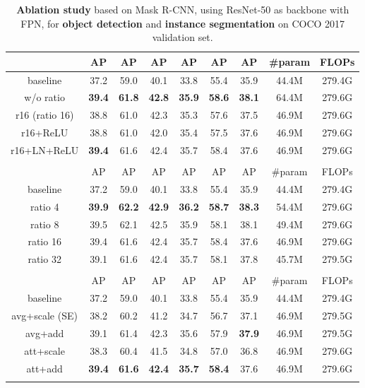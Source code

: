 \documentclass[10pt,twocolumn,letterpaper]{article}
\begin{document}
\begin{table}[]
\begin{tabular}{c|ccc|ccc|c|c}
& AP & AP & AP&AP&AP&AP &  \#param & FLOPs \\
\hline
    baseline & 37.2   & 59.0 & 40.1 & 33.8 & 55.4 & 35.9 & 44.4M & 279.4G \\
w/o ratio & \textbf{39.4} & \textbf{61.8} & \textbf{42.8} & \textbf{35.9} & \textbf{58.6} & \textbf{38.1} & 64.4M & 279.6G \\
r16 (ratio 16) & 38.8 & 61.0 & 42.3 & 35.3 & 57.6 & 37.5 & 46.9M & 279.6G \\
r16+ReLU & 38.8 & 61.0 & 42.0 & 35.4 & 57.5 & 37.6 & 46.9M & 279.6G \\
r16+LN+ReLU & \textbf{39.4} & 61.6 & 42.4 & 35.7 & 58.4 & 37.6 & 46.9M & 279.6G \\
\Xhline{1.0pt}
\multicolumn{9}{c}{(e) \textbf{Bottleneck ratio}}                                        \\
& AP & AP & AP&AP&AP&AP &  \#param & FLOPs \\
\hline
    baseline & 37.2   & 59.0 & 40.1 & 33.8 & 55.4 & 35.9 & 44.4M & 279.4G \\
ratio 4  & \textbf{39.9} & \textbf{62.2} & \textbf{42.9} & \textbf{36.2} & \textbf{58.7} & \textbf{38.3} & 54.4M & 279.6G \\
ratio 8  & 39.5 & 62.1  & 42.5 & 35.9 & 58.1 & 38.1 & 49.4M & 279.6G \\
ratio 16 & 39.4 & 61.6 & 42.4 & 35.7 & 58.4 & 37.6 & 46.9M & 279.6G \\
ratio 32 & 39.1 & 61.6 & 42.4 & 35.7 & 58.1 & 37.8 & 45.7M & 279.5G \\
\Xhline{1.0pt}
\multicolumn{9}{c}{(f) \textbf{Pooling and fusion}}                                \\
& AP & AP & AP&AP&AP&AP &  \#param & FLOPs \\
\hline
    baseline & 37.2   & 59.0 & 40.1 & 33.8 & 55.4 & 35.9 & 44.4M & 279.4G \\
avg+scale (SE) & 38.2 & 60.2 & 41.2 & 34.7 & 56.7 & 37.1 & 46.9M & 279.5G \\
avg+add & 39.1 & 61.4 & 42.3 & 35.6 & 57.9 & \textbf{37.9} & 46.9M & 279.5G \\
att+scale & 38.3 & 60.4 & 41.5 & 34.8 & 57.0 & 36.8 & 46.9M & 279.6G \\
att+add & \textbf{39.4} & \textbf{61.6} & \textbf{42.4} & \textbf{35.7} & \textbf{58.4} & 37.6 & 46.9M & 279.6G \\
\Xhline{1.0pt}
\end{tabular}
	\vspace{-8pt}
\caption{\textbf{Ablation study} based on Mask R-CNN, using ResNet-50 as backbone with FPN, for \textbf{object detection} and \textbf{instance segmentation} on COCO 2017 validation set.}
	\label{table:ablation-coco}
	\vspace{-10pt}
\end{table}
\end{document}
